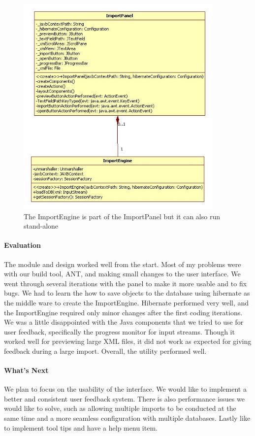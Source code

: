 \begin{figure}[h]
	\centering
		\includegraphics[width=4.00in]{Images/ImportClasses.jpg}
	\caption{The ImportEngine is part of the ImportPanel but it can also run stand-alone}
	\label{fig:ImportClasses}
\end{figure}

\paragraph{Evaluation}
The module and design worked well from the start. Most of my problems were with our build tool, ANT, and making small changes to the user interface. We went through several iterations with the panel to make it more usable and to fix bugs. We had to learn the how to save objects to the database using hibernate as the middle ware to create the ImportEngine. Hibernate performed very well, and the ImportEngine required only minor changes after the first coding iterations. We was a little disappointed with the Java components that we tried to use for user feedback, specifically the progress monitor for input streams. Though it worked well for previewing large XML files, it did not work as expected for giving feedback during a large import. Overall, the utility performed well. 

\paragraph{What's Next}
We plan to focus on the usability of the interface. We would like to implement a better and consistent user feedback system. There is also performance issues we would like to solve, such as allowing multiple imports to be conducted at the same time and a more seamless configuration with multiple databases. Lastly like to implement tool tips and have a help menu item. 

